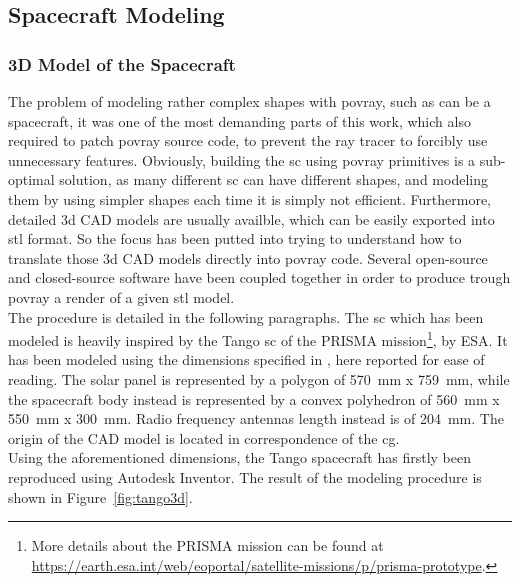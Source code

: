 \subsection{Spacecraft Modeling}

\subsubsection{3D Model of the Spacecraft}\label{sec:3dmodel}
The problem of modeling rather complex shapes with \acrshort{povray}, such as can be a spacecraft, it was one of the most demanding parts of this work, which also required to patch \acrshort{povray} source code, to prevent the ray tracer to forcibly use unnecessary features. Obviously, building the \acrshort{sc} using \acrshort{povray} primitives is a sub-optimal solution, as many different \acrshort{sc} can have different shapes, and modeling them by using simpler shapes each time it is simply not efficient. Furthermore, detailed \acrshort{3d} CAD models are usually availble, which can be easily exported into \acrshort{stl} format. So the focus has been putted into trying to understand how to translate those \acrshort{3d} CAD models directly into \acrshort{povray} code.
Several open-source and closed-source software have been coupled together in order to produce trough \acrshort{povray} a render of a given \acrshort{stl} model.\\
The procedure is detailed in the following paragraphs.
The \acrshort{sc} which has been modeled is heavily inspired by the Tango \acrshort{sc} of the PRISMA mission\footnote{More details about the PRISMA mission can be found at \url{https://earth.esa.int/web/eoportal/satellite-missions/p/prisma-prototype}.}, by ESA. It has been modeled using the dimensions specified in \cite{Sharma2018}, here reported for ease of reading. The solar panel is represented by a polygon of \SI{570}{\mm} x \SI{759}{\mm}, while the spacecraft body instead is represented by a convex polyhedron of \SI{560}{\mm} x \SI{550}{mm} x \SI{300}{\mm}. Radio frequency antennas length instead is of \SI{204}{\mm}. The origin of the CAD model is located in correspondence of the \acrshort{cg}.\\
Using the aforementioned dimensions, the Tango spacecraft has firstly been reproduced using Autodesk Inventor. The result of the modeling procedure is shown in Figure~\ref{fig:tango3d}.

